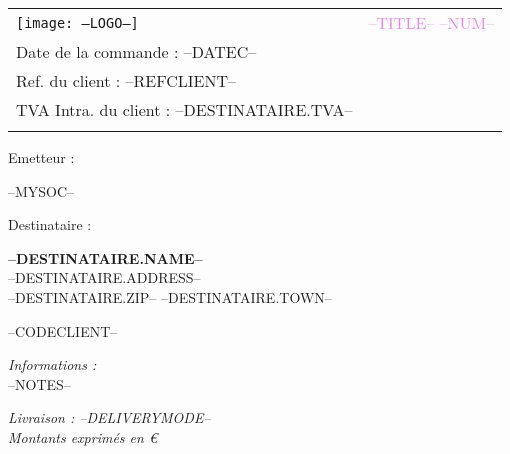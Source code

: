 \newcommand{\FOOT}{--FOOT--}

\newcommand{\specialcell}[2][c]{
	\parbox[#1]{7.7cm}{#2}}
	
\begin{tabular}{p{9cm} p{8cm}}
    \vspace{0pt} 
    \texttt{[image: --LOGO--]}
    & 
    \vspace{0pt}
   \raggedleft
	\textcolor{violet}{\textsc{\Large --TITLE-- --NUM--}}\\
	Date de la commande : --DATEC--\\
	Ref. du client : --REFCLIENT--\\
	TVA Intra. du  client : --DESTINATAIRE.TVA--\\}~\\
\end{tabular}

\vspace{-0.7cm}

\begin{minipage}[t]{0.40\textwidth}
{\small Emetteur :}\\
\begin{fminipage}
--MYSOC--
\end{fminipage}
\end{minipage}
\hspace{1cm}
\begin{minipage}[t]{0.52\textwidth}
{\small Destinataire :}

\begin{fminipage}
\textbf{\large --DESTINATAIRE.NAME--}\\
--DESTINATAIRE.ADDRESS--\\
\textsc{--DESTINATAIRE.ZIP-- --DESTINATAIRE.TOWN--}\\
\begin{minipage}{\textwidth}
\flushright
{\tiny --CODECLIENT--}
\end{minipage}
\end{fminipage}
\end{minipage}

\begin{minipage}[t]{0.60\textwidth}
{\small \it Informations :}\\
--NOTES-- \\
\end{minipage}
\hspace{1cm}
\begin{minipage}[t]{0.32\textwidth}
\begin{flushright}
{\it Livraison : {--DELIVERYMODE--}}\\
\vspace{1em}
{\footnotesize \textit{Montants exprimés en €}}
\end{flushright}
\end{minipage}

